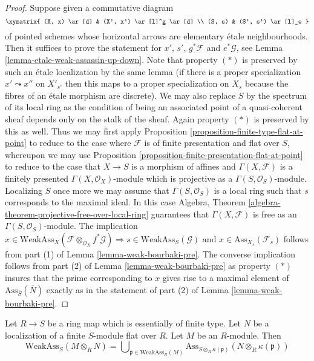 \begin{proof}
\medskip\noindent
Suppose given a commutative diagram
$$
\xymatrix{
(X, x) \ar[d] & (X', x') \ar[l]^g \ar[d] \\
(S, s) & (S', s') \ar[l]_e
}
$$
of pointed schemes whose horizontal arrows are elementary \'etale
neighbourhoods. Then it suffices to prove the statement for
$x'$, $s'$, $g^*\mathcal{F}$ and $e^*\mathcal{G}$, see
Lemma \ref{lemma-etale-weak-assassin-up-down}.
Note that property $(*)$ is preserved by such an \'etale localization
by the same lemma (if there is a proper specialization
$x' \leadsto x''$ on $X'_{s'}$ then this maps to a proper
specialization on $X_s$ because the fibres of an \'etale morphism
are discrete). We may also replace $S$ by the spectrum of its local ring
as the condition of being an associated point of a quasi-coherent sheaf
depends only on the stalk of the sheaf. Again property $(*)$ is
preserved by this as well. Thus we may first apply
Proposition \ref{proposition-finite-type-flat-at-point}
to reduce to the case where $\mathcal{F}$ is of finite presentation
and flat over $S$, whereupon we may use
Proposition \ref{proposition-finite-presentation-flat-at-point}
to reduce to the case that $X \to S$ is a morphism of affines
and $\Gamma(X, \mathcal{F})$ is a finitely presented
$\Gamma(X, \mathcal{O}_X)$-module which is projective as a
$\Gamma(S, \mathcal{O}_S)$-module. Localizing $S$ once more we
may assume that $\Gamma(S, \mathcal{O}_S)$ is a local ring such that
$s$ corresponds to the maximal ideal. In this case
Algebra, Theorem \ref{algebra-theorem-projective-free-over-local-ring}
guarantees that $\Gamma(X, \mathcal{F})$ is free as an
$\Gamma(S, \mathcal{O}_S)$-module. The implication
$x \in \text{WeakAss}_X(\mathcal{F} \otimes_{\mathcal{O}_X} f^*\mathcal{G})
\Rightarrow
s \in \text{WeakAss}_S(\mathcal{G})
\text{ and }
x \in \text{Ass}_{X_s}(\mathcal{F}_s)$ follows from part (1) of
Lemma \ref{lemma-weak-bourbaki-pre}.
The converse implication follows from
part (2) of Lemma \ref{lemma-weak-bourbaki-pre}
as property $(*)$ insures that the prime corresponding
to $x$ gives rise to a maximal element of
$\text{Ass}_{\overline{S}}(\overline{N})$ exactly as in the statement
of part (2) of
Lemma \ref{lemma-weak-bourbaki-pre}.
\end{proof}

\begin{lemma}
\label{lemma-weak-bourbaki}
Let $R \to S$ be a ring map which is essentially of finite type.
Let $N$ be a localization of a finite $S$-module flat over $R$.
Let $M$ be an $R$-module. Then
$$
\text{WeakAss}_S(M \otimes_R N)
=
\bigcup\nolimits_{\mathfrak p \in \text{WeakAss}_R(M)}
\text{Ass}_{S \otimes_R \kappa(\mathfrak p)}(N \otimes_R \kappa(\mathfrak p))
$$
\end{lemma}

